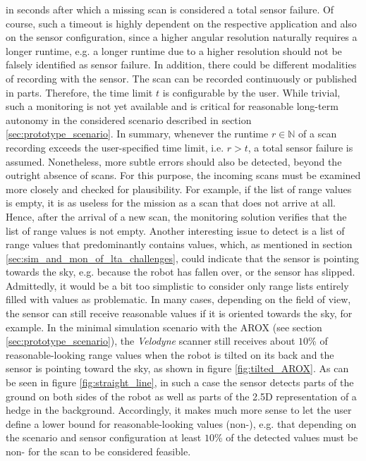 \documentclass[english, master, utf8]{base/thesis_KBS}
\newcommand{\code}{\collectverb{\codebox}}
\begin{document}
in seconds after which a missing scan is considered a total sensor failure. Of course, such a timeout is highly dependent on the respective application and also on the sensor 
configuration, since a higher angular resolution naturally requires a longer runtime, e.g. a longer runtime due to a higher resolution should not be falsely identified 
as sensor failure. In addition, there could be different modalities of recording with the sensor. The scan can be recorded continuously or published in parts.
Therefore, the time limit $t$ is configurable by the user. While trivial, such a monitoring is not yet available and is critical for reasonable long-term autonomy in the 
considered scenario described in section \ref{sec:prototype_scenario}. In summary, whenever the runtime $r \in \mathbb{N}$ of a scan recording exceeds the user-specified time
limit, i.e. $r > t$, a total sensor failure is assumed. Nonetheless, more subtle errors should also be detected, beyond the outright absence of scans.
For this purpose, the incoming scans must be examined more closely and checked for plausibility. For example, if the list of range values is empty, it is as useless for
the mission as a scan that does not arrive at all. Hence, after the arrival of a new scan, the monitoring solution verifies that the list of range values is not empty.
Another interesting issue to detect is a list of range values that predominantly contains \code{inf} values, which, as mentioned in section
\ref{sec:sim_and_mon_of_lta_challenges}, could indicate that the sensor is pointing towards the sky, e.g. because the robot has fallen over,
or the sensor has slipped. Admittedly, it would be a bit too simplistic to consider only range lists entirely filled with \code{inf} values as problematic.
In many cases, depending on the field of view, the sensor can still receive reasonable values if it is oriented towards the sky, for example.
In the minimal simulation scenario with the AROX (see section \ref{sec:prototype_scenario}), the \textit{Velodyne} scanner still receives about $10$\% of 
reasonable-looking range values when the robot is tilted on its back and the sensor is pointing toward the sky, as shown in figure \ref{fig:tilted_AROX}.
As can be seen in figure \ref{fig:straight_line}, in such a case the sensor detects parts of the ground on both sides of the robot as well as parts of the 2.5D 
representation of a hedge in the background. Accordingly, it makes much more sense to let the user define a lower bound for reasonable-looking values (non-\code{inf}),
e.g. that depending on the scenario and sensor configuration at least $10$\% of the detected values must be non-\code{inf} for the scan to be considered feasible.
\end{document}
